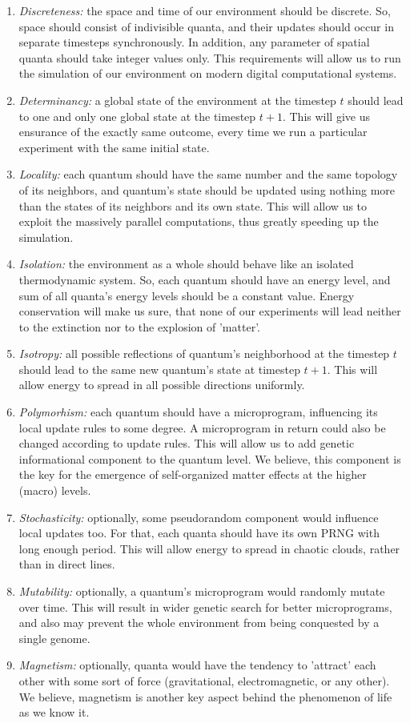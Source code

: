\documentclass[a4paper,12pt,tikz,UTF8]{article}
\begin{document}
\begin{enumerate}
\begin{enumerate}
        \item \textit{Discreteness:} the space and time of our environment should be discrete. So, space should consist of indivisible quanta, and their updates should occur in separate timesteps synchronously. In addition, any parameter of spatial quanta should take integer values only. This requirements will allow us to run the simulation of our environment on modern digital computational systems.
        \item \textit{Determinancy:} a global state of the environment at the timestep $t$ should lead to one and only one global state at the timestep $t + 1$. This will give us ensurance of the exactly same outcome, every time we run a particular experiment with the same initial state.
        \item \textit{Locality:} each quantum should have the same number and the same topology of its neighbors, and quantum's state should be updated using nothing more than the states of its neighbors and its own state. This will allow us to exploit the massively parallel computations, thus greatly speeding up the simulation.
        \item \textit{Isolation:} the environment as a whole should behave like an isolated thermodynamic system. So, each quantum should have an energy level, and sum of all quanta's energy levels should be a constant value. Energy conservation will make us sure, that none of our experiments will lead neither to the extinction nor to the explosion of 'matter'.
        \item \textit{Isotropy:} all possible reflections of quantum's neighborhood at the timestep $t$ should lead to the same new quantum's state at timestep $t + 1$. This will allow energy to spread in all possible directions uniformly. 
        \item \textit{Polymorhism:} each quantum should have a microprogram, influencing its local update rules to some degree. A microprogram in return could also be changed according to update rules. This will allow us to add genetic informational component to the quantum level. We believe, this component is the key for the emergence of self-organized matter effects at the higher (macro) levels.
        \item \textit{Stochasticity:} optionally, some pseudorandom component would influence local updates too. For that, each quanta should have its own PRNG with long enough period. This will allow energy to spread in chaotic clouds, rather than in direct lines.
        \item \textit{Mutability:} optionally, a quantum's microprogram would randomly mutate over time. This will result in wider genetic search for better microprograms, and also may prevent the whole environment from being conquested by a single genome.
        \item \textit{Magnetism:} optionally, quanta would have the tendency to 'attract' each other with some sort of force (gravitational, electromagnetic, or any other). We believe, magnetism is another key aspect behind the phenomenon of life as we know it.
      \end{enumerate}


\end{enumerate}
\end{document}
